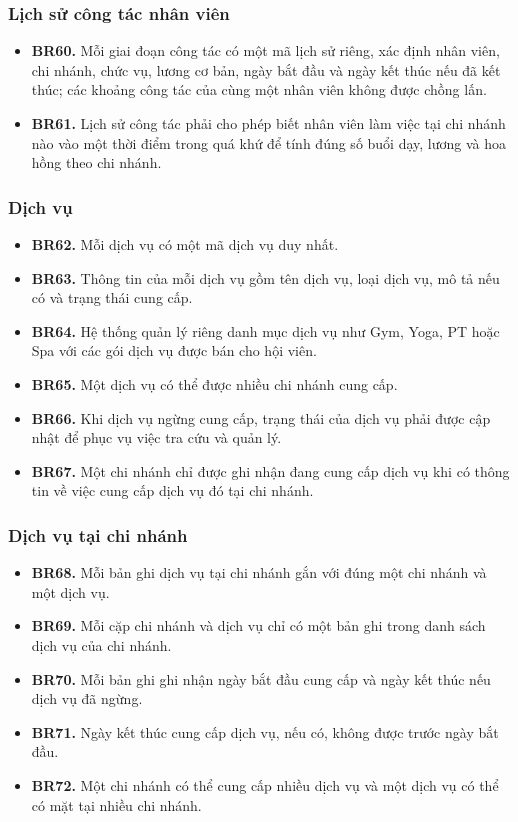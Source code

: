 \documentclass[11pt, a4paper]{article}
\begin{document}
\subsubsection{Lịch sử công tác nhân viên}
\begin{itemize}
    \item \textbf{BR60.} Mỗi giai đoạn công tác có một mã lịch sử riêng, xác định nhân viên, chi nhánh, chức vụ, lương cơ bản, ngày bắt đầu và ngày kết thúc nếu đã kết thúc; các khoảng công tác của cùng một nhân viên không được chồng lấn.
    \item \textbf{BR61.} Lịch sử công tác phải cho phép biết nhân viên làm việc tại chi nhánh nào vào một thời điểm trong quá khứ để tính đúng số buổi dạy, lương và hoa hồng theo chi nhánh.
\end{itemize}

\subsubsection{Dịch vụ}
\begin{itemize}
    \item \textbf{BR62.} Mỗi dịch vụ có một mã dịch vụ duy nhất.
    \item \textbf{BR63.} Thông tin của mỗi dịch vụ gồm tên dịch vụ, loại dịch vụ, mô tả nếu có và trạng thái cung cấp.
    \item \textbf{BR64.} Hệ thống quản lý riêng danh mục dịch vụ như Gym, Yoga, PT hoặc Spa với các gói dịch vụ được bán cho hội viên.
    \item \textbf{BR65.} Một dịch vụ có thể được nhiều chi nhánh cung cấp.
    \item \textbf{BR66.} Khi dịch vụ ngừng cung cấp, trạng thái của dịch vụ phải được cập nhật để phục vụ việc tra cứu và quản lý.
    \item \textbf{BR67.} Một chi nhánh chỉ được ghi nhận đang cung cấp dịch vụ khi có thông tin về việc cung cấp dịch vụ đó tại chi nhánh.
\end{itemize}

\subsubsection{Dịch vụ tại chi nhánh}
\begin{itemize}
    \item \textbf{BR68.} Mỗi bản ghi dịch vụ tại chi nhánh gắn với đúng một chi nhánh và một dịch vụ.
    \item \textbf{BR69.} Mỗi cặp chi nhánh và dịch vụ chỉ có một bản ghi trong danh sách dịch vụ của chi nhánh.
    \item \textbf{BR70.} Mỗi bản ghi ghi nhận ngày bắt đầu cung cấp và ngày kết thúc nếu dịch vụ đã ngừng.
    \item \textbf{BR71.} Ngày kết thúc cung cấp dịch vụ, nếu có, không được trước ngày bắt đầu.
    \item \textbf{BR72.} Một chi nhánh có thể cung cấp nhiều dịch vụ và một dịch vụ có thể có mặt tại nhiều chi nhánh.
\end{itemize}
\end{document}
